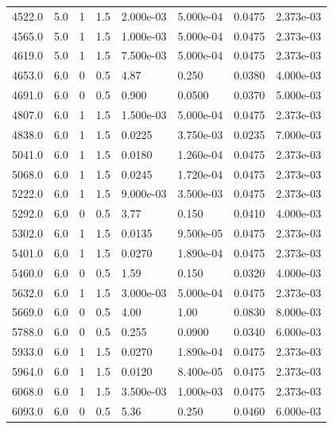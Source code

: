 \documentclass[preview]{standalone}
\begin{document}
{{{\begin{tabular}{L{1.2cm}C{1.2cm} C{0.3cm}C{0.5cm} C{1.4cm}C{1.4cm} C{1.4cm}C{1.4cm}}
  4522.0  &   5.0  & 1     & 1.5 &  2.000e-03  & 5.000e-04  & 0.0475 &  2.373e-03   \\ 
  4565.0  &   5.0  & 1     & 1.5 &  1.000e-03  & 5.000e-04  & 0.0475 &  2.373e-03   \\ 
  4619.0  &   5.0  & 1     & 1.5 &  7.500e-03  & 5.000e-04  & 0.0475 &  2.373e-03   \\ 
  4653.0  &   6.0  & 0     & 0.5 &  4.87  & 0.250  & 0.0380 &  4.000e-03   \\ 
  4691.0  &   6.0  & 0     & 0.5 &  0.900  & 0.0500  & 0.0370 &  5.000e-03   \\ 
  4807.0  &   6.0  & 1     & 1.5 &  1.500e-03  & 5.000e-04  & 0.0475 &  2.373e-03   \\ 
  4838.0  &   6.0  & 1     & 1.5 &  0.0225  & 3.750e-03  & 0.0235 &  7.000e-03   \\ 
  5041.0  &   6.0  & 1     & 1.5 &  0.0180  & 1.260e-04  & 0.0475 &  2.373e-03   \\ 
  5068.0  &   6.0  & 1     & 1.5 &  0.0245  & 1.720e-04  & 0.0475 &  2.373e-03   \\ 
  5222.0  &   6.0  & 1     & 1.5 &  9.000e-03  & 3.500e-03  & 0.0475 &  2.373e-03   \\ 
  5292.0  &   6.0  & 0     & 0.5 &  3.77  & 0.150  & 0.0410 &  4.000e-03   \\ 
  5302.0  &   6.0  & 1     & 1.5 &  0.0135  & 9.500e-05  & 0.0475 &  2.373e-03   \\ 
  5401.0  &   6.0  & 1     & 1.5 &  0.0270  & 1.890e-04  & 0.0475 &  2.373e-03   \\ 
  5460.0  &   6.0  & 0     & 0.5 &  1.59  & 0.150  & 0.0320 &  4.000e-03   \\ 
  5632.0  &   6.0  & 1     & 1.5 &  3.000e-03  & 5.000e-04  & 0.0475 &  2.373e-03   \\ 
  5669.0  &   6.0  & 0     & 0.5 &  4.00  & 1.00  & 0.0830 &  8.000e-03   \\ 
  5788.0  &   6.0  & 0     & 0.5 &  0.255  & 0.0900  & 0.0340 &  6.000e-03   \\ 
  5933.0  &   6.0  & 1     & 1.5 &  0.0270  & 1.890e-04  & 0.0475 &  2.373e-03   \\ 
  5964.0  &   6.0  & 1     & 1.5 &  0.0120  & 8.400e-05  & 0.0475 &  2.373e-03   \\ 
  6068.0  &   6.0  & 1     & 1.5 &  3.500e-03  & 1.000e-03  & 0.0475 &  2.373e-03   \\ 
  6093.0  &   6.0  & 0     & 0.5 &  5.36  & 0.250  & 0.0460 &  6.000e-03   \\ 

\end{tabular}}}}
\end{document}
